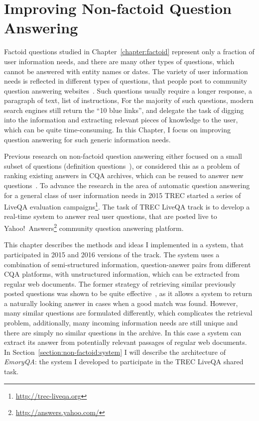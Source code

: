 \chapter{Improving Non-factoid Question Answering}
\label{chapter:non-factoid}

Factoid questions studied in Chapter~\ref{chapter:factoid} represent only a fraction of user information needs, and there are many other types of questions, which cannot be answered with entity names or dates.
The variety of user information needs is reflected in different types of questions, that people post to community question answering websites~\cite{harper2010question,ignatova2009annotating,Liu:2008:USA:1599081.1599144}.
Such questions usually require a longer response, \eg a paragraph of text, list of instructions, \etc
For the majority of such questions, modern search engines still return the ``10 blue links'', and delegate the task of digging into the information and extracting relevant pieces of knowledge to the user, which can be quite time-consuming.
In this Chapter, I focus on improving question answering for such generic information needs.

Previous research on non-factoid question answering either focused on a small subset of questions (\eg definition questions~\cite{hildebrandt2004answering}), or considered this as a problem of ranking existing answers in CQA archives, which can be reused to answer new questions~\cite{carmel2000eresponder,Shtok:2012:LPA:2187836.2187939}.
To advance the research in the area of automatic question answering for a general class of user information needs in 2015 TREC started a series of LiveQA evaluation campaigns\footnote{\href{url}{http://trec-liveqa.org}}.
The task of TREC LiveQA track is to develop a real-time system to answer real user questions, that are posted live to Yahoo!~Answers\footnote{\href{url}{http://answers.yahoo.com/}} community question answering platform.

This chapter describes the methods and ideas I implemented in a system, that participated in 2015 and 2016 versions of the track.
The system uses a combination of semi-structured information, \ie question-answer pairs from different CQA platforms, with unstructured information, which can be extracted from regular web documents.
The former strategy of retrieving similar previously posted questions was shown to be quite effective~\cite{carmel2000eresponder,Shtok:2012:LPA:2187836.2187939}, as it allows a system to return a naturally looking answer in cases when a good match was found.
However, many similar questions are formulated differently, which complicates the retrieval problem, additionally, many incoming information needs are still unique and there are simply no similar questions in the archive.
In this case a system can extract its answer from potentially relevant passages of regular web documents.
In Section~\ref{section:non-factoid:system} I will describe the architecture of \textit{EmoryQA}: the system I developed to participate in the TREC LiveQA shared task.

